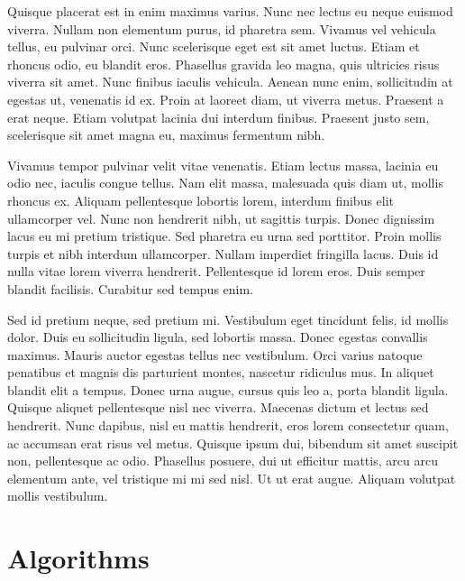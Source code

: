 \documentclass[conference]{IEEEtran}
\begin{document}
Quisque placerat est in enim maximus varius. Nunc nec lectus eu neque euismod viverra. Nullam non elementum purus, id pharetra sem. Vivamus vel vehicula tellus, eu pulvinar orci. Nunc scelerisque eget est sit amet luctus. Etiam et rhoncus odio, eu blandit eros. Phasellus gravida leo magna, quis ultricies risus viverra sit amet. Nunc finibus iaculis vehicula. Aenean nunc enim, sollicitudin at egestas ut, venenatis id ex. Proin at laoreet diam, ut viverra metus. Praesent a erat neque. Etiam volutpat lacinia dui interdum finibus. Praesent justo sem, scelerisque sit amet magna eu, maximus fermentum nibh.

Vivamus tempor pulvinar velit vitae venenatis. Etiam lectus massa, lacinia eu odio nec, iaculis congue tellus. Nam elit massa, malesuada quis diam ut, mollis rhoncus ex. Aliquam pellentesque lobortis lorem, interdum finibus elit ullamcorper vel. Nunc non hendrerit nibh, ut sagittis turpis. Donec dignissim lacus eu mi pretium tristique. Sed pharetra eu urna sed porttitor. Proin mollis turpis et nibh interdum ullamcorper. Nullam imperdiet fringilla lacus. Duis id nulla vitae lorem viverra hendrerit. Pellentesque id lorem eros. Duis semper blandit facilisis. Curabitur sed tempus enim.

Sed id pretium neque, sed pretium mi. Vestibulum eget tincidunt felis, id mollis dolor. Duis eu sollicitudin ligula, sed lobortis massa. Donec egestas convallis maximus. Mauris auctor egestas tellus nec vestibulum. Orci varius natoque penatibus et magnis dis parturient montes, nascetur ridiculus mus. In aliquet blandit elit a tempus. Donec urna augue, cursus quis leo a, porta blandit ligula. Quisque aliquet pellentesque nisl nec viverra. Maecenas dictum et lectus sed hendrerit. Nunc dapibus, nisl eu mattis hendrerit, eros lorem consectetur quam, ac accumsan erat risus vel metus. Quisque ipsum dui, bibendum sit amet suscipit non, pellentesque ac odio. Phasellus posuere, dui ut efficitur mattis, arcu arcu elementum ante, vel tristique mi mi sed nisl. Ut ut erat augue. Aliquam volutpat mollis vestibulum. 

\section{Algorithms}
\end{document}
